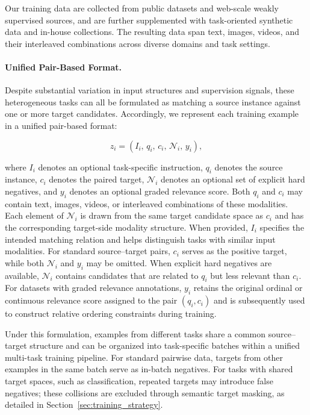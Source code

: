 \documentclass[]{wechat}
\begin{document}
Our training data are collected from public datasets and web-scale weakly supervised sources, and are further supplemented with task-oriented synthetic data and in-house collections. The resulting data span text, images, videos, and their interleaved combinations across diverse domains and task settings.

\paragraph{Unified Pair-Based Format.}

Despite substantial variation in input structures and supervision signals, these heterogeneous tasks can all be formulated as matching a source instance against one or more target candidates. Accordingly, we represent each training example in a unified pair-based format:

\begin{equation}
    z_i
    =
    \left(
        I_i,\,
        q_i,\,
        c_i,\,
        \mathcal{N}_i,\,
        y_i
    \right),
    \label{eq:pair_data_format}
\end{equation}

where $I_i$ denotes an optional task-specific instruction, $q_i$ denotes the source instance, $c_i$ denotes the paired target, $\mathcal{N}_i$ denotes an optional set of explicit hard negatives, and $y_i$ denotes an optional graded relevance score. Both $q_i$ and $c_i$ may contain text, images, videos, or interleaved combinations of these modalities. Each element of $\mathcal{N}_i$ is drawn from the same target candidate space as $c_i$ and has the corresponding target-side modality structure. When provided, $I_i$ specifies the intended matching relation and helps distinguish tasks with similar input modalities. For standard source--target pairs, $c_i$ serves as the positive target, while both $\mathcal{N}_i$ and $y_i$ may be omitted. When explicit hard negatives are available, $\mathcal{N}_i$ contains candidates that are related to $q_i$ but less relevant than $c_i$. For datasets with graded relevance annotations, $y_i$ retains the original ordinal or continuous relevance score assigned to the pair $(q_i,c_i)$ and is subsequently used to construct relative ordering constraints during training.

Under this formulation, examples from different tasks share a common source--target structure and can be organized into task-specific batches within a unified multi-task training pipeline. For standard pairwise data, targets from other examples in the same batch serve as in-batch negatives. For tasks with shared target spaces, such as classification, repeated targets may introduce false negatives; these collisions are excluded through semantic target masking, as detailed in Section~\ref{sec:training_strategy}.
\end{document}
